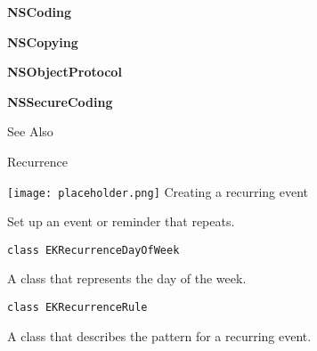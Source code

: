 \documentclass{article}
\begin{document}
\textbf{NSCoding}

\textbf{NSCopying}

\textbf{NSObjectProtocol}

\textbf{NSSecureCoding}

See Also

Recurrence

\texttt{[image: placeholder.png]} Creating a recurring event

Set up an event or reminder that repeats.

\texttt{class EKRecurrenceDayOfWeek}

A class that represents the day of the week.

\texttt{class EKRecurrenceRule}

A class that describes the pattern for a recurring event.
\newpage
\end{document}
